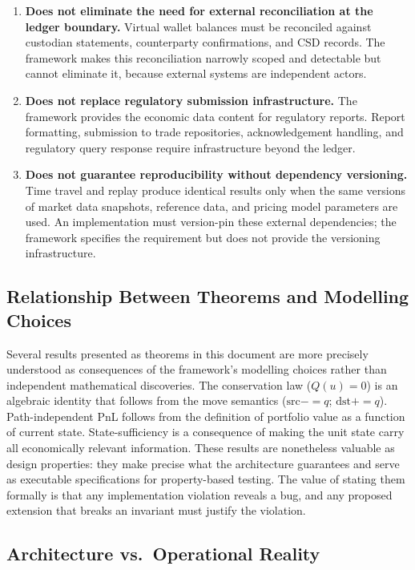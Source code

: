 \documentclass[11pt,a4paper]{article}
\begin{document}
\begin{enumerate}
\item \textbf{Does not eliminate the need for external reconciliation at the ledger boundary.} Virtual wallet balances must be reconciled against custodian statements, counterparty confirmations, and CSD records. The framework makes this reconciliation narrowly scoped and detectable but cannot eliminate it, because external systems are independent actors.

\item \textbf{Does not replace regulatory submission infrastructure.} The framework provides the economic data content for regulatory reports. Report formatting, submission to trade repositories, acknowledgement handling, and regulatory query response require infrastructure beyond the ledger.

\item \textbf{Does not guarantee reproducibility without dependency versioning.} Time travel and replay produce identical results only when the same versions of market data snapshots, reference data, and pricing model parameters are used. An implementation must version-pin these external dependencies; the framework specifies the requirement but does not provide the versioning infrastructure.
\end{enumerate}

\subsection{Relationship Between Theorems and Modelling Choices}

Several results presented as theorems in this document are more precisely understood as consequences of the framework's modelling choices rather than independent mathematical discoveries. The conservation law ($Q(u) = 0$) is an algebraic identity that follows from the move semantics ($\mathrm{src} \mathbin{{-}{=}} q$; $\mathrm{dst} \mathbin{{+}{=}} q$). Path-independent PnL follows from the definition of portfolio value as a function of current state. State-sufficiency is a consequence of making the unit state carry all economically relevant information. These results are nonetheless valuable as design properties: they make precise what the architecture guarantees and serve as executable specifications for property-based testing. The value of stating them formally is that any implementation violation reveals a bug, and any proposed extension that breaks an invariant must justify the violation.

\subsection{Architecture vs.\ Operational Reality}
\end{document}
